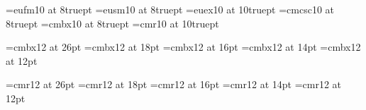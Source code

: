 % 
% 

\loadeufm     %

\loadmsam
\loadmsbm


\font\footmi=eufm10 at 8truept
\font\footsu=eusm10 at 8truept
\font\footex=euex10 at 10truept
\font\footsc=cmcsc10 at 8truept
\font\footbf=cmbx10 at 8truept
\font\footrm=cmr10 at 10truept

\font\hugebf=cmbx12 at 26pt
\font\Bigbf=cmbx12  at 18pt
\font\bigbf=cmbx12  at 16pt
\font\Medbf=cmbx12  at 14pt
\font\medbf=cmbx12  at 12pt

\font\hugerm=cmr12 at 26pt
\font\Bigrm=cmr12  at 18pt
\font\bigrm=cmr12  at 16pt
\font\Medrm=cmr12  at 14pt
\font\medrm=cmr12  at 12pt

